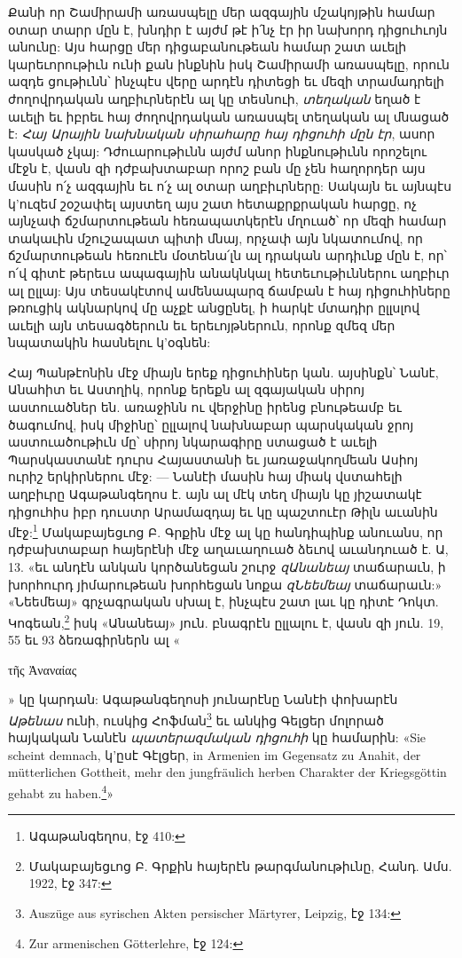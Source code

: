 \documentclass{article}
\begin{document}
{Քանի որ Շամիրամի առասպելը մեր ազգային մշակոյթին համար օտար տարր մըն է, խնդիր է այժմ թէ ի՛նչ էր իր նախորդ դիցուհւոյն անունը: Այս հարցը մեր դիցաբանութեան համար շատ աւելի կարեւորութիւն ունի քան ինքնին իսկ Շամիրամի առասպելը, որուն ազդե ցութիւնն՝ ինչպէս վերը արդէն դիտեցի եւ մեզի տրամադրելի ժողովրդական աղբիւրներէն ալ կը տեսնուի, \emph{տեղական} եղած է աւելի եւ իբրեւ հայ ժողովրդական առասպել տեղական ալ մնացած է: \emph{Հայ Արային նախնական սիրահարը հայ դիցուհի մըն էր}, ասոր կասկած չկայ: Դժուարութիւնն այժմ անոր ինքնութիւնն որոշելու մէջն է, վասն զի դժբախտաբար որոշ բան մը չեն հաղորդեր այս մասին ո՛չ ազգային եւ ո՛չ ալ օտար աղբիւրները: Սակայն եւ այնպէս կ'ուզեմ շօշափել այստեղ այս շատ հետաքրքրական հարցը, ոչ այնչափ ճշմարտութեան հեռապատկերէն մղուած՝ որ մեզի համար տակաւին մշուշապատ պիտի մնայ, որչափ այն նկատումով, որ ճշմարտութեան հեռուէն մօտենա՛լն ալ դրական արդիւնք մըն է, որ՝ ո՛վ գիտէ թերեւս ապագային անակնկալ հետեւութիւններու աղբիւր ալ ըլլայ: Այս տեսակէտով ամենապարզ ճամբան է հայ դիցուհիները թռուցիկ ակնարկով մը աչքէ անցընել, ի հարկէ մտադիր ըլլսլով աւելի այն տեսագծերուն եւ երեւոյթներուն, որոնք զմեզ մեր նպատակին հասնելու կ'օգնեն:

Հայ Պանթէոնին մէջ միայն երեք դիցուհիներ կան. այսինքն՝ Նանէ, Անահիտ եւ Աստղիկ, որոնք երեքն ալ զգայական սիրոյ աստուածներ են. առաջինն ու վերջինը իրենց բնութեամբ եւ ծագումով, իսկ միջինը՝ ըլլալով նախնաբար պարսկական ջրոյ աստուածութիւն մը՝ սիրոյ նկարագիրը ստացած է աւելի Պարսկաստանէ դուրս Հայաստանի եւ յառաջակողմեան Ասիոյ ուրիշ երկիրներու մէջ: — Նանէի մասին հայ միակ վստահելի աղբիւրը Ագաթանգեղոս է. այն ալ մէկ տեղ միայն կը յիշատակէ դիցուհիս իբր դուստր Արամազդայ եւ կը պաշտուէր Թիլն աւանին մէջ:\footnote{Ագաթանգեղոս, էջ 410:} Մակաբայեցւոց Բ. Գրքին մէջ ալ կը հանդիպինք անուանս, որ դժբախտաբար հայերէնի մէջ աղաւաղուած ձեւով աւանդուած է. Ա, 13. «եւ անդէն անկան կործանեցան շուրջ \emph{զԱնանեայ} տաճարաւն, ի խորհուրդ յիմարութեան խորհեցան նոքա \emph{զՆեեմեայ} տաճարաւն:» «Նեեմեայ» գրչագրական սխալ է, ինչպէս շատ լաւ կը դիտէ Դոկտ. Կոգեան,\footnote{Մակաբայեցւոց Բ. Գրքին հայերէն թարգմանութիւնը, Հանդ. Ամս. 1922, էջ 347:} իսկ «Անանեայ» յուն. բնագրէն ըլլալու է, վասն զի յուն. 19, 55 եւ 93 ձեռագիրներն ալ «\begin{greek}τῆς Ἀναναίας\end{greek}» կը կարդան: Ագաթանգեղոսի յունարէնը Նանէի փոխարէն \emph{Աթենաս} ունի, ուսկից Հոֆման\footnote{Auszüge aus syrischen Akten persischer Märtyrer, Leipzig, էջ 134:} եւ անկից Գելցեր մոլորած հայկական Նանէն \emph{պատերազմական դիցուհի} կը համարին: «Sie scheint demnach, կ'ըսէ Գէլցեր, in Armenien im Gegensatz zu Anahit, der mütterlichen Gottheit, mehr den jungfräulich herben Charakter der Kriegsgöttin gehabt zu haben.\footnote{Zur armenischen Götterlehre, էջ 124:}»

}
\end{document}
